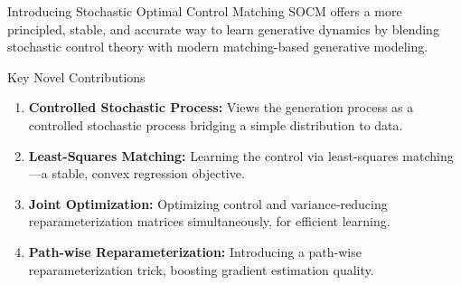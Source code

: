 \documentclass[aspectratio=169,xcolor=dvipsnames]{beamer}
\begin{document}
\begin{frame}{Introducing Stochastic Optimal Control Matching}
    SOCM offers a more principled, stable, and accurate way to learn generative dynamics by blending stochastic control theory with modern matching-based generative modeling.
    
    \vspace{0.4cm}
    
    \begin{block}{Key Novel Contributions}
        \begin{enumerate}
            \item \textbf{Controlled Stochastic Process:} Views the generation process as a controlled stochastic process bridging a simple distribution to data.
            
            \vspace{0.2cm}
            
            \item \textbf{Least-Squares Matching:} Learning the control via least-squares matching—a stable, convex regression objective.
            
            \vspace{0.2cm}
            
            \item \textbf{Joint Optimization:} Optimizing control and variance-reducing reparameterization matrices simultaneously, for efficient learning.
            
            \vspace{0.2cm}
            
            \item \textbf{Path-wise Reparameterization:} Introducing a path-wise reparameterization trick, boosting gradient estimation quality.
        \end{enumerate}
    \end{block}
\end{frame}
\end{document}
